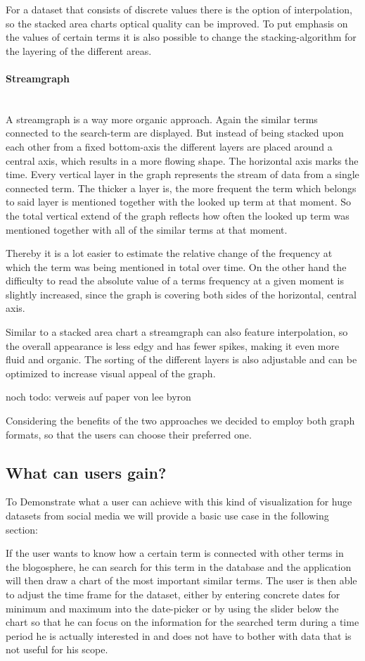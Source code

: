 \documentclass{llncs}
\newcommand{\myparagraph}[1]{\paragraph{#1}\mbox{}\\}
\begin{document}
For a dataset that consists of discrete values there is the option of interpolation, so the stacked area charts optical quality can be improved. To put emphasis on the values of certain terms it is also possible to change the stacking-algorithm for the layering of the different areas.

\myparagraph{Streamgraph}

A streamgraph is a way more organic approach. Again the similar terms connected to the search-term are displayed. But instead of being stacked upon each other from a fixed bottom-axis the different layers are placed around a central axis, which results in a more flowing shape. The horizontal axis marks the time. Every vertical layer in the graph represents the stream of data from a single connected term. The thicker a layer is, the more frequent the term which belongs to said layer is mentioned together with the looked up term at that moment. So the total vertical extend of the graph reflects how often the looked up term was mentioned together with all of the similar terms at that moment.

Thereby it is a lot easier to estimate the relative change of the frequency at which the term was being mentioned in total over time. On the other hand the difficulty to read the absolute value of a terms frequency at a given moment is slightly increased, since the graph is covering both sides of the horizontal, central axis.

Similar to a stacked area chart a streamgraph can also feature interpolation, so the overall appearance is less edgy and has fewer spikes, making it even more fluid and organic. The sorting of the different layers is also adjustable and can be optimized to increase visual appeal of the graph. 


noch todo: verweis auf paper von lee byron 



Considering the benefits of the two approaches we decided to employ both graph formats, so that the users can choose their preferred one.


\subsection{What can users gain?}
To Demonstrate what a user can achieve with this kind of visualization for huge datasets from social media we will provide a basic use case in the following section: 


If the user wants to know how a certain term is connected with other terms in the blogosphere, he can search for this term in the database and the application will then draw a chart of the most important similar terms. The user is then able to adjust the time frame for the dataset, either by entering concrete dates for minimum and maximum into the date-picker or by using the slider below the chart so that he can focus on the information for the searched term during a time period he is actually interested in and does not have to bother with data that is not useful for his scope.
\end{document}

